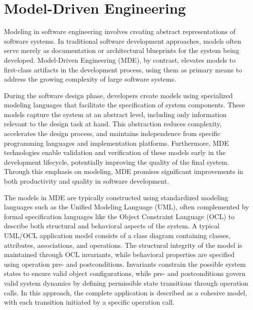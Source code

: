 \section{Model-Driven Engineering}

\hspace{1cm} Modeling in software engineering involves creating abstract representations of software systems. In traditional software development approaches, models often serve merely as documentation or architectural blueprints for the system being developed. Model-Driven Engineering (MDE), by contrast, elevates models to first-class artifacts in the development process, using them as primary means to address the growing complexity of large software systems.

During the software design phase, developers create models using specialized modeling languages that facilitate the specification of system components. These models capture the system at an abstract level, including only information relevant to the design task at hand. This abstraction reduces complexity, accelerates the design process, and maintains independence from specific programming languages and implementation platforms. Furthermore, MDE technologies enable validation and verification of these models early in the development lifecycle, potentially improving the quality of the final system. Through this emphasis on modeling, MDE promises significant improvements in both productivity and quality in software development.

The models in MDE are typically constructed using standardized modeling languages such as the Unified Modeling Language (UML), often complemented by formal specification languages like the Object Constraint Language (OCL) to describe both structural and behavioral aspects of the system. A typical UML/OCL application model consists of a class diagram containing classes, attributes, associations, and operations. The structural integrity of the model is maintained through OCL invariants, while behavioral properties are specified using operation pre- and postconditions. Invariants constrain the possible system states to ensure valid object configurations, while pre- and postconditions govern valid system dynamics by defining permissible state transitions through operation calls. In this approach, the complete application is described as a cohesive model, with each transition initiated by a specific operation call.

